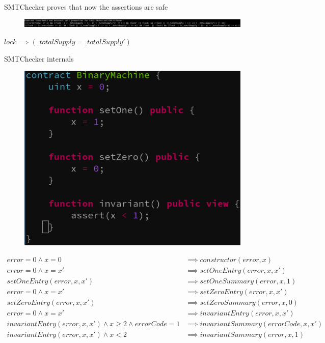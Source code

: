 \documentclass[aspectratio=169,10pt]{beamer}
\begin{document}
\begin{frame}[fragile]
\begin{center}
SMTChecker proves that now the assertions are safe
\begin{figure}
	\includegraphics[scale=0.23]{images/erc777_pass_smtchecker_invariants}
\end{figure}
$lock \implies (\_totalSupply = \_totalSupply')$
\end{center}
\end{frame}

\begin{frame}[fragile]
\begin{center}
SMTChecker internals
\begin{figure}
	\includegraphics[scale=0.4]{images/binary_machine_code}
\end{figure}
\end{center}
\end{frame}

\begin{frame}[fragile]
{\small
\begin{align*}
error = 0 \land x = 0  & \implies constructor(error, x) \\
error = 0 \land x = x' & \implies setOneEntry(error, x, x') \\
setOneEntry(error, x, x') & \implies setOneSummary(error, x, 1) \\
error = 0 \land x = x' & \implies setZeroEntry(error, x, x') \\
setZeroEntry(error, x, x') & \implies setZeroSummary(error, x, 0) \\
error = 0 \land x = x' & \implies invariantEntry(error, x, x') \\
invariantEntry(error, x, x') \land x \ge 2 \land errorCode = 1 & \implies invariantSummary(errorCode, x, x') \\
invariantEntry(error, x, x') \land x < 2 & \implies invariantSummary(error, x, 1) \\
\end{align*}
}%
\end{frame}
\end{document}
